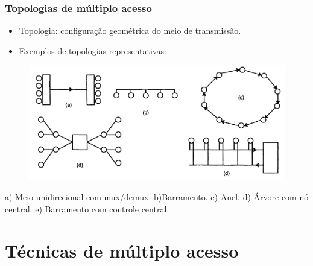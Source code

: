 \begin{frame}
	\frametitle{Topologias de múltiplo acesso}

	\begin{itemize}
	    \item Topologia: configuração geométrica do meio de transmissão.
	    \item Exemplos de topologias representativas: 
	\end{itemize} \vspace{-0.2cm}
	    \begin{figure}[t]	
	    \begin{center}
		\includegraphics[width=0.75\columnwidth]{figs/ma_01}
	    \end{center}
	    \end{figure} \vspace{-0.2cm}
	    \begin{footnotesize}a) Meio unidirecional com mux/demux. b)Barramento. c) Anel. d) Árvore com nó central. e) Barramento com controle central.\end{footnotesize}
\end{frame}

\section{Técnicas de múltiplo acesso}

